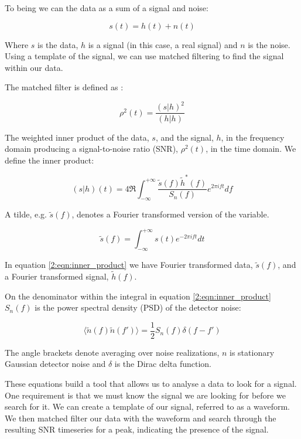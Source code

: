 To being we can the data as a sum of a signal and noise:

\begin{equation}
   s(t) = h(t) + n(t)
   \label{2:eqn:s_h_n}
\end{equation}

Where $s$ is the data, $h$ is a signal (in this case, a real \gw signal) and $n$ is the noise. Using a template of the signal, we can use matched filtering to find the signal within our data.

The matched filter is defined as \cite{PyCBC:2016}:

\begin{equation}
   \rho^2(t) = \frac{(s|h)^2}{(h|h)}
   \label{2:eqn:matched_filter}
\end{equation}

The weighted inner product of the data, $s$, and the signal, $h$, in the frequency domain producing a signal-to-noise ratio (SNR), $\rho^2(t)$, in the time domain. We define the inner product:

\begin{equation}
   (s|h)(t) = 4 \Re \int^{+\infty}_{-\infty} \frac{\tilde{s}(f) \tilde{h}^*(f)}{S_n(f)} e^{2 \pi i f t} df
   \label{2:eqn:inner_product}
\end{equation}

A tilde, e.g. $\tilde{s}(f)$, denotes a Fourier transformed version of the variable.

\begin{equation}
   \tilde{s}(f) = \int^{+\infty}_{-\infty} s(t) e^{-2 \pi i f t} dt
   \label{2:eqn:fourier_transform}
\end{equation}

In equation \ref{2:eqn:inner_product} we have Fourier transformed data, $\tilde{s}(f)$, and a Fourier transformed signal, $\tilde{h}(f)$.

On the denominator within the integral in equation \ref{2:eqn:inner_product} $S_n(f)$ is the power spectral density (PSD) of the detector noise:

\begin{equation}
   \langle \tilde{n}(f) \tilde{n}(f') \rangle = \frac{1}{2} S_n(f) \delta(f-f')
   \label{2:eqn:PSD}
\end{equation}

The angle brackets denote averaging over noise realizations, $n$ is stationary Gaussian detector noise and $\delta$ is the Dirac delta function.

These equations build a tool that allows us to analyse a data to look for a signal. One requirement is that we must know the signal we are looking for before we search for it. We can create a template of our signal, referred to as a waveform. We then matched filter our data with the waveform and search through the resulting SNR timeseries for a peak, indicating the presence of the signal.

